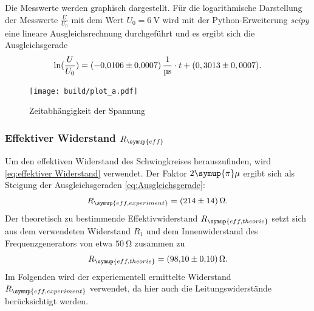 Die Messwerte werden graphisch dargestellt. Für die logarithmische Darstellung der Messwerte $\frac{U}{U_0}$ mit dem Wert $U_0=\qty{6}{\volt}$
wird mit der Python-Erweiterung \textit{scipy} \cite{scipy} eine lineare Ausgleichsrechnung durchgeführt und es ergibt sich die Ausgleichsgerade
\begin{equation}
  \ln(\frac{U}{U_0})=\qty{-0,0106+-0,0007}{\per\micro\second} \cdot t + (0,3013\pm0,0007).
  \label{eq:Ausgleichsgerade}
\end{equation}

\begin{figure} [H]
  \centering
  \texttt{[image: build/plot\_a.pdf]}
  \caption{Zeitabhängigkeit der Spannung}
  \label{fig:plot_a}
\end{figure}

\subsubsection{Effektiver Widerstand $R_{\symup{eff}}$}
Um den effektiven Widerstand des Schwingkreises herauszufinden, wird \eqref{eq:effektiver Widerstand} verwendet. Der Faktor $2\symup{\pi}\mu$ ergibt
sich als Steigung der Ausgleichsgeraden \eqref{eq:Ausgleichsgerade}:
\begin{equation*}
  R_{\symup{eff, experiment}}=\qty{214+-14}{\ohm}.
\end{equation*}
Der theoretisch zu bestimmende Effektivwiderstand $R_{\symup{eff, theorie}}$ setzt sich aus dem verwendeten Widerstand $R_1$ und dem
Innenwiderstand des Frequenzgenerators von etwa $\qty{50}{\ohm}$ zusammen zu
\begin{equation*}
  R_{\symup{eff, theorie}} = \qty{98.10+-0.10}{\ohm}.
\end{equation*}
Im Folgenden wird der experiementell ermittelte Widerstand $R_{\symup{eff, experiment}}$ verwendet, da hier auch die Leitungswiderstände 
berücksichtigt werden.

